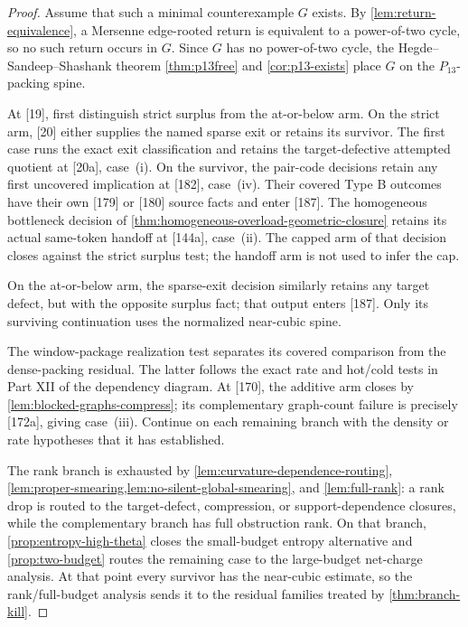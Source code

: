 \documentclass[11pt]{article}
\begin{document}
\begin{proof}
Assume that such a minimal counterexample
\(G\) exists.  By \cref{lem:return-equivalence}, a Mersenne edge-rooted return
is equivalent to a power-of-two cycle, so no such return occurs in \(G\).
Since \(G\) has no power-of-two cycle, the Hegde--Sandeep--Shashank theorem
\cref{thm:p13free} and \cref{cor:p13-exists} place \(G\) on the
\(P_{13}\)-packing spine.

At [19], first distinguish strict surplus from the at-or-below arm.  On the
strict arm, [20] either supplies the named sparse exit or retains its
survivor.  The first case runs the exact exit classification and retains the
target-defective attempted quotient at [20a], case~\textup{(i)}.  On the
survivor, the pair-code decisions retain any first uncovered implication at
[182], case~\textup{(iv)}.  Their covered Type B outcomes have their own
[179] or [180] source facts and enter [187].  The homogeneous bottleneck
decision of \cref{thm:homogeneous-overload-geometric-closure} retains its
actual same-token handoff at [144a], case~\textup{(ii)}.  The capped arm of
that decision closes against the strict surplus test; the handoff arm is not
used to infer the cap.

On the at-or-below arm, the sparse-exit decision similarly retains any
target defect, but with the opposite surplus fact; that output enters [187].
Only its surviving continuation uses the normalized near-cubic spine.

The window-package realization test separates its covered comparison from
the dense-packing residual.  The latter follows the exact rate and hot/cold
tests in Part XII of the dependency diagram.  At [170], the additive arm
closes by \cref{lem:blocked-graphs-compress}; its complementary graph-count
failure is precisely [172a], giving case~\textup{(iii)}.  Continue on each
remaining branch with the density or rate hypotheses that it has established.

The rank branch is exhausted by \cref{lem:curvature-dependence-routing},
\cref{lem:proper-smearing,lem:no-silent-global-smearing}, and
\cref{lem:full-rank}: a rank drop is routed to the target-defect,
compression, or support-dependence closures, while the complementary branch has
full obstruction rank.  On that branch, \cref{prop:entropy-high-theta} closes the
small-budget entropy alternative and \cref{prop:two-budget} routes the
remaining case to the large-budget net-charge analysis.  At that point every
survivor has the near-cubic estimate, so the rank/full-budget analysis sends it
to the residual families treated by \cref{thm:branch-kill}.


\end{proof}
\end{document}
